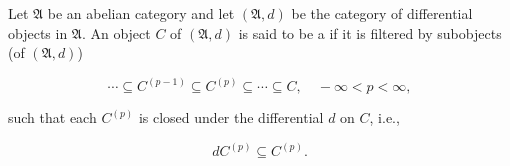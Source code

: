Let $\mathfrak{A}$ be an abelian category and let $(\mathfrak{A}, d)$ be the category of differential objects in $\mathfrak{A}$. An object $C$ of $(\mathfrak{A}, d)$ is said to be a  if it is filtered by subobjects (of $(\mathfrak{A}, d)$)

$$\cdots \subseteq C^{(p-1)} \subseteq C^{(p)} \subseteq \cdots \subseteq C, \quad -\infty < p < \infty,$$

such that each $C^{(p)}$ is closed under the differential $d$ on $C$, i.e.,

$$dC^{(p)} \subseteq C^{(p)}.$$
